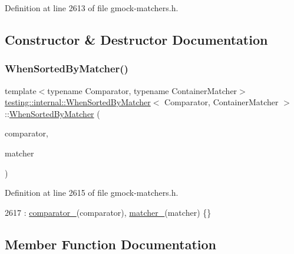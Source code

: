 Definition at line 2613 of file gmock-\/matchers.\+h.



\subsection{Constructor \& Destructor Documentation}
\mbox{\label{classtesting_1_1internal_1_1WhenSortedByMatcher_a5c5e625b3f0be9f7380f5be744f61b1c}} 
\subsubsection{\texorpdfstring{When\+Sorted\+By\+Matcher()}{WhenSortedByMatcher()}}
{\footnotesize\ttfamily template$<$typename Comparator, typename Container\+Matcher$>$ \\
\hyperlink{classtesting_1_1internal_1_1WhenSortedByMatcher}{testing\+::internal\+::\+When\+Sorted\+By\+Matcher}$<$ Comparator, Container\+Matcher $>$\+::\hyperlink{classtesting_1_1internal_1_1WhenSortedByMatcher}{When\+Sorted\+By\+Matcher} (\begin{DoxyParamCaption}\item[{const Comparator \&}]{comparator,  }\item[{const Container\+Matcher \&}]{matcher }\end{DoxyParamCaption})\hspace{0.3cm}{\ttfamily [inline]}}



Definition at line 2615 of file gmock-\/matchers.\+h.


\begin{DoxyCode}
2617       : \hyperlink{classtesting_1_1internal_1_1WhenSortedByMatcher_adea7dca9b0e3b5d2ab198cc9c29b1c2d}{comparator\_}(comparator), \hyperlink{classtesting_1_1internal_1_1WhenSortedByMatcher_ab873ba633a5f7dfc46440e8f2c9d5611}{matcher\_}(matcher) \{\}
\end{DoxyCode}


\subsection{Member Function Documentation}
\mbox{\label{classtesting_1_1internal_1_1WhenSortedByMatcher_a123a50e78beca9a4a4f7b7cb4c9e18d5}} 
